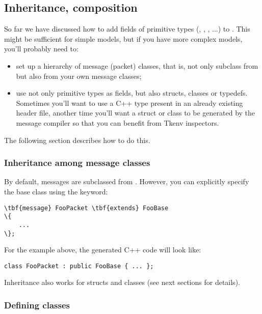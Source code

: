 \subsection{Inheritance, composition}

So far we have discussed how to add fields of primitive types
(, , , ...) to .
This might be sufficient for simple models, but if you have
more complex models, you'll probably need to:

\begin{itemize}
  \item set up a hierarchy of message (packet) classes, that is,
    not only subclass from  but also from your
    own message classes;
  \item use not only primitive types as fields, but also structs,
    classes or typedefs. Sometimes you'll want to use a C++ type
    present in an already existing header file, another time you'll
    want a struct or class to be generated by the message
    compiler so that you can benefit from Tkenv inspectors.
\end{itemize}

The following section describes how to do this.


\subsubsection{Inheritance among message classes}

By default, messages are subclassed from . However, you can
explicitly specify the base class using the  keyword:

\begin{Verbatim}[commandchars=\\\{\}]
\tbf{message} FooPacket \tbf{extends} FooBase
\{
    ...
\};
\end{Verbatim}

For the example above, the generated C++ code will look like:

\begin{verbatim}
class FooPacket : public FooBase { ... };
\end{verbatim}

Inheritance also works for structs and classes (see next sections
for details).



\subsubsection{Defining classes}

